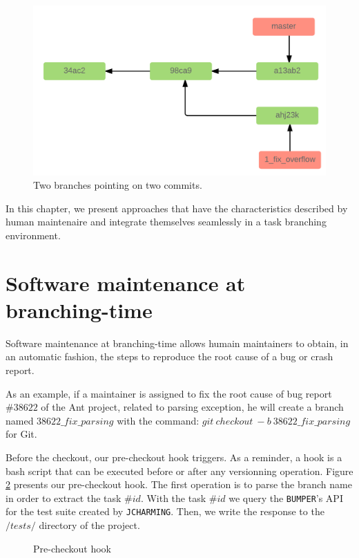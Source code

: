 \begin{figure}[h!]
  \centering
    \includegraphics[scale=0.25]{media/merge.png}
    \caption{Two branches pointing on two commits.
    \label{fig:merge}}
\end{figure}

In this chapter, we present approaches that have the characteristics described by human maintenaire and integrate themselves seamlessly in a task branching environment.

\section{Software maintenance at branching-time}

Software maintenance at branching-time allows humain maintainers to obtain, in an automatic fashion, the steps to reproduce the root cause of a bug or crash report.

As an example, if a maintainer is assigned to fix the root cause of bug report $\#38622$ of the Ant project, related to parsing exception, he will create a branch named $38622\_fix\_parsing$ with the command: $git~checkout~-b~38622\_fix\_parsing$ for Git.

Before the checkout, our pre-checkout hook triggers.
As a reminder, a hook is a bash script that can be executed before or after any versionning operation.
Figure \ref{fig:pre-checkout-hook} presents our pre-checkout hook.
The first operation is to parse the branch name in order to extract the task $\#id$.
With the task $\#id$ we query the {\tt BUMPER}'s API for the test suite created by {\tt JCHARMING}.
Then, we write the response to the $/tests/$ directory of the project.

\begin{figure}
  
  \caption{Pre-checkout hook
  \label{fig:pre-checkout-hook}}
\end{figure}

